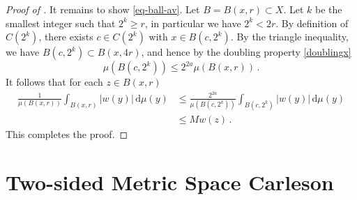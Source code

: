 \documentclass[10pt,a4paper]{article}
\theoremstyle{plain}
\theoremstyle{definition}
\numberwithin{equation}{subsection}
\begin{document}
\begin{proof}[Proof of ]
It remains to show \eqref{eq-ball-av}. Let $B = B(x, r) \subset X$. Let $k$ be the smallest integer such that $2^k \ge r$, in particular we have $2^k < 2r$. By definition of $C(2^k)$, there exists $c \in C(2^k)$ with $x \in B(c, 2^k)$. By the triangle inequality, we have $B(c, 2^k) \subset B(x, 4r)$, and hence by the doubling property \eqref{doublingx}
$$
    \mu(B(c, 2^k)) \le 2^{2a} \mu(B(x,r))\,.
$$
It follows that for each $z \in B(x,r)$
\begin{align*}
    \frac{1}{\mu(B(x,r))}\int_{B(x,r)} |w(y)| \, \mathrm{d}\mu(y) &\le \frac{2^{2a}}{\mu(B(c,2^k))}\int_{B(c,2^k)} |w(y)| \, \mathrm{d}\mu(y) \\
    &\le Mw(z)\,.
\end{align*}
This completes the proof.
\end{proof}

\section{Two-sided Metric Space Carleson}
\end{document}
